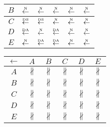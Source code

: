 \begin{table}[htbp]
\begin{subtable}{1\textwidth}
\begin{minipage}[b]{0.3\textwidth}
\begin{tabular}{|c|c|c|c|c|c|}
        $B$ & $\overset{\text{\tiny{N}}}{\leftarrow}$ & $\overset{\text{\tiny{N}}}{\leftarrow}$ & $\overset{\text{\tiny{N}}}{\leftarrow}$ & $\overset{\text{\tiny{N}}}{\leftarrow}$ & $\overset{\text{\tiny{N}}}{\leftarrow}$\\ \hline
        $C$ & $\overset{\text{\tiny{DS}}}{\leftarrow}$ & $\overset{\text{\tiny{DS}}}{\leftarrow}$ & $\overset{\text{\tiny{N}}}{\leftarrow}$ & $\overset{\text{\tiny{N}}}{\leftarrow}$ & $\overset{\text{\tiny{N}}}{\leftarrow}$\\ \hline
        $D$ & $\overset{\text{\tiny{DA}}}{\leftarrow}$ & $\overset{\text{\tiny{N}}}{\leftarrow}$ & $\overset{\text{\tiny{DA}}}{\leftarrow}$ & $\overset{\text{\tiny{N}}}{\leftarrow}$ & $\overset{\text{\tiny{N}}}{\leftarrow}$\\ \hline
        $E$ & $\overset{\text{\tiny{N}}}{\leftarrow}$ & $\overset{\text{\tiny{DA}}}{\leftarrow}$ & $\overset{\text{\tiny{DA}}}{\leftarrow}$ & $\overset{\text{\tiny{N}}}{\leftarrow}$ & $\overset{\text{\tiny{N}}}{\leftarrow}$\\ \hline
      \end{tabular}
    \end{minipage}
    \begin{minipage}[b]{0.3\textwidth}
      \centering
      \begin{tabular}{|c|c|c|c|c|c|} \hline
        $\leftarrow$ & $A$ & $B$ & $C$ & $D$ & $E$\\ \hline
        $A$ & $\nparallel$ & $\nparallel$ & $\nparallel$ & $\nparallel$ & $\nparallel$\\ \hline
        $B$ & $\nparallel$ & $\nparallel$ & $\nparallel$ & $\nparallel$ & $\nparallel$\\ \hline
        $C$ & $\nparallel$ & $\nparallel$ & $\nparallel$ & $\nparallel$ & $\nparallel$\\ \hline
        $D$ & $\nparallel$ & $\nparallel$ & $\nparallel$ & $\nparallel$ & $\nparallel$\\ \hline
        $E$ & $\nparallel$ & $\nparallel$ & $\nparallel$ & $\nparallel$ & $\nparallel$\\ \hline
      \end{tabular}
    \end{minipage}
  \end{subtable}


\end{table}
